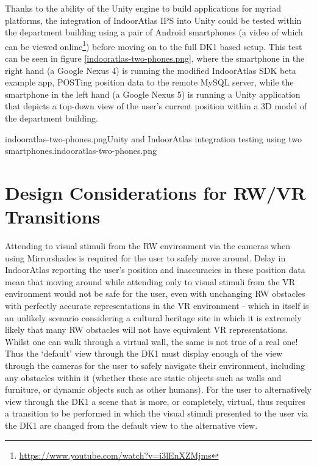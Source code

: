 Thanks to the ability of the Unity engine to build applications for myriad platforms, the integration of IndoorAtlas IPS into Unity could be tested within the department building using a pair of Android smartphones (a video of which can be viewed online\footnote{\url{https://www.youtube.com/watch?v=i3lEnXZMjms}}) before moving on to the full DK1 based setup. This test can be seen in figure \ref{indooratlas-two-phones.png}, where the smartphone in the right hand (a Google Nexus 4) is running the modified IndoorAtlas SDK beta example app, POSTing position data to the remote MySQL server, while the smartphone in the left hand (a Google Nexus 5) is running a Unity application that depicts a top-down view of the user's current position within a 3D model of the department building.

	   {indooratlas-two-phones.png}{Unity and IndoorAtlas integration testing using two smartphones.}{indooratlas-two-phones.png}
       


\section{Design Considerations for RW/VR Transitions}
\label{design-considerations-for-rw-vr-transitions}
Attending to visual stimuli from the RW environment via the cameras when using Mirrorshades is required for the user to safely move around. Delay in IndoorAtlas reporting the user's position and inaccuracies in these position data mean that moving around while attending only to visual stimuli from the VR environment would not be safe for the user, even with unchanging RW obstacles with perfectly accurate representations in the VR environment - which in itself is an unlikely scenario considering a cultural heritage site in which it is extremely likely that many RW obstacles will not have equivalent VR representations. Whilst one can walk through a virtual wall, the same is not true of a real one! Thus the `default' view through the DK1 must display enough of the view through the cameras for the user to safely navigate their environment, including any obstacles within it (whether these are static objects such as walls and furniture, or dynamic objects such as other humans). For the user to alternatively view through the DK1 a scene that is more, or completely, virtual, thus requires a transition to be performed in which the visual stimuli presented to the user via the DK1 are changed from the default view to the alternative view.

